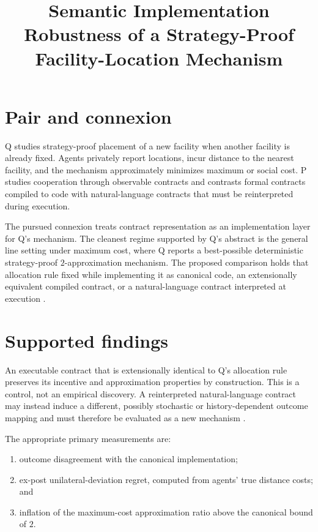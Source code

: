 \documentclass{article}
\title{Semantic Implementation Robustness of a Strategy-Proof Facility-Location Mechanism}
\begin{document}
\maketitle

\section{Pair and connexion}

Q studies strategy-proof placement of a new facility when another facility is already fixed. Agents privately report locations, incur distance to the nearest facility, and the mechanism approximately minimizes maximum or social cost. P studies cooperation through observable contracts and contrasts formal contracts compiled to code with natural-language contracts that must be reinterpreted during execution.

The pursued connexion treats contract representation as an implementation layer for Q's mechanism. The cleanest regime supported by Q's abstract is the general line setting under maximum cost, where Q reports a best-possible deterministic strategy-proof \(2\)-approximation mechanism. The proposed comparison holds that allocation rule fixed while implementing it as canonical code, an extensionally equivalent compiled contract, or a natural-language contract interpreted at execution .

\section{Supported findings}

An executable contract that is extensionally identical to Q's allocation rule preserves its incentive and approximation properties by construction. This is a control, not an empirical discovery. A reinterpreted natural-language contract may instead induce a different, possibly stochastic or history-dependent outcome mapping and must therefore be evaluated as a new mechanism .

The appropriate primary measurements are:

\begin{enumerate}
\item outcome disagreement with the canonical implementation;
\item ex-post unilateral-deviation regret, computed from agents' true distance costs; and
\item inflation of the maximum-cost approximation ratio above the canonical bound of \(2\).
\end{enumerate}
\end{document}
